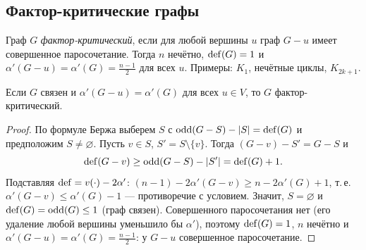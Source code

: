 \subsection*{Фактор-критические графы}
\begin{definition}
Граф \(G\) \emph{фактор-критический}, если для любой вершины \(u\) граф \(G-u\)
имеет совершенное паросочетание. Тогда \(n\) нечётно, \(\operatorname{def}(G)=1\) и
\(\alpha'(G-u)=\alpha'(G)=\frac{n-1}2\) для всех \(u\).
Примеры: \(K_1\), нечётные циклы, \(K_{2k+1}\).
\end{definition}
\begin{lemma}[Галлаи]\label{lem:gallai}
Если \(G\) связен и \(\alpha'(G-u)=\alpha'(G)\) для всех \(u\in V\), то \(G\) фактор-критический.
\end{lemma}
\begin{proof}
По формуле Бержа выберем \(S\) с \(\operatorname{odd}(G-S)-|S|=\operatorname{def}(G)\) и предположим \(S\ne\varnothing\).
Пусть \(v\in S\), \(S'=S\setminus\{v\}\). Тогда \((G-v)-S'=G-S\) и
\[
\operatorname{def}(G-v)\ge\operatorname{odd}(G-S)-|S'|=\operatorname{def}(G)+1 .
\]
Подставляя \(\operatorname{def}=v(\cdot)-2\alpha'\): \((n-1)-2\alpha'(G-v)\ge n-2\alpha'(G)+1\), т.\,е.
\(\alpha'(G-v)\le\alpha'(G)-1\) — противоречие с условием. Значит, \(S=\varnothing\) и
\(\operatorname{def}(G)=\operatorname{odd}(G)\le1\) (граф связен). Совершенного паросочетания нет (его
удаление любой вершины уменьшило бы \(\alpha'\)), поэтому \(\operatorname{def}(G)=1\),
\(n\) нечётно и \(\alpha'(G-u)=\alpha'(G)=\frac{n-1}{2}\): у \(G-u\) совершенное паросочетание.
\end{proof}

